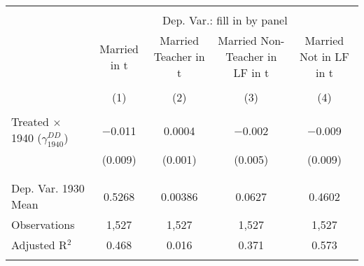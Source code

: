 
\begin{tabular}{@{\extracolsep{5pt}}lcccc} 
\\[-1.8ex]\hline 
\hline \\[-1.8ex] 
 & \multicolumn{4}{c}{Dep. Var.: fill in by panel} \\ 
\cline{2-5} 
 & Married in t & Married Teacher in t & Married Non-Teacher in LF in t & Married Not in LF in t \\ 
\\[-1.8ex] & (1) & (2) & (3) & (4)\\ 
\hline \\[-1.8ex] 
 Treated $\times$ 1940 ($\gamma_{1940}^{DD}$) & $-$0.011 & 0.0004 & $-$0.002 & $-$0.009 \\ 
  & (0.009) & (0.001) & (0.005) & (0.009) \\ 
  & & & & \\ 
\hline \\[-1.8ex] 
Dep. Var. 1930 Mean & 0.5268 & 0.00386 & 0.0627 & 0.4602 \\ 
Observations & 1,527 & 1,527 & 1,527 & 1,527 \\ 
Adjusted R$^{2}$ & 0.468 & 0.016 & 0.371 & 0.573 \\ 
\hline 
\hline \\[-1.8ex] 
\end{tabular} 
